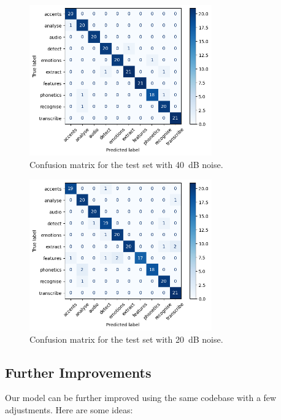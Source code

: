 \documentclass[12pt]{article}
\begin{document}
\begin{figure}[h]
    \centering
    \includegraphics[width=0.7\textwidth]{confusion_matrix_noise_40db.png}
    \caption{Confusion matrix for the test set with 40~dB noise.}
    \label{fig:confusion_matrix_noise_40db}
\end{figure}

\begin{figure}[h]
    \centering
    \includegraphics[width=0.7\textwidth]{confusion_matrix_noise_20db.png}
    \caption{Confusion matrix for the test set with 20~dB noise.}
    \label{fig:confusion_matrix_noise_20db}
\end{figure}

\subsection{Further Improvements}

Our model can be further improved using the same codebase with a few adjustments. Here are some ideas:
\end{document}
